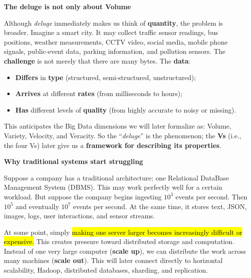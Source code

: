 \highspace
\begin{flushleft}
    \textcolor{Green3}{ \textbf{The deluge is not only about Volume}}
\end{flushleft}
Although \emph{deluge} immediately makes us think of \textbf{quantity}, the problem is broader. Imagine a smart city. It may collect traffic sensor readings, bus positions, weather measurements, CCTV video, social media, mobile phone signals, public-event data, parking information, and pollution sensors. The \textbf{challenge} is not merely that there are many bytes. The \textbf{data}:
\begin{itemize}
    \item \textbf{Differs} in \textbf{type} (structured, semi-structured, unstructured);
    \item \textbf{Arrives} at different \textbf{rates} (from milliseconds to hours);
    \item \textbf{Has} different levels of \textbf{quality} (from highly accurate to noisy or missing).
\end{itemize}
This anticipates the Big Data dimensions we will later formalize as: Volume, Variety, Velocity, and Veracity. So the ``\emph{deluge}'' is the phenomenon; the \textbf{Vs} (i.e., the four Vs) later give us a \textbf{framework for describing its properties}.

\newpage

\begin{flushleft}
    \textcolor{Red2}{ \textbf{Why traditional systems start struggling}}
\end{flushleft}
Suppose a company has a traditional architecture: one Relational DataBase Management System (DBMS). This may work perfectly well for a certain workload. But suppose the company begins ingesting $10^3$ events per second. Then $10^5$ and eventually $10^7$ events per second. At the same time, it stores text, JSON, images, logs, user interactions, and sensor streams.

\highspace
At some point, simply \hl{making one server larger becomes increasingly difficult or expensive.} This creates pressure toward distributed storage and computation. Instead of one very large computer (\textbf{scale up}), we can distribute the work across many machines (\textbf{scale out}). This will later connect directly to horizontal scalability, Hadoop, distributed databases, sharding, and replication.

